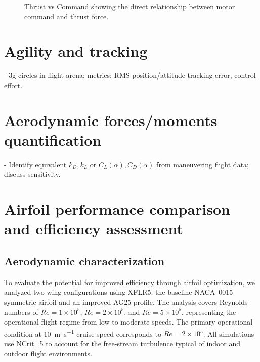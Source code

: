 \begin{figure}[htbp]
  \centering
  \caption{Thrust vs Command showing the direct relationship between motor command and thrust force.}
  \label{fig:thrust_vs_cmd}
\end{figure}

\section{Agility and tracking}
- 3g circles in flight arena; metrics: RMS position/attitude tracking error, control effort.

\section{Aerodynamic forces/moments quantification}
- Identify equivalent $k_D,k_L$ or $C_L(\alpha), C_D(\alpha)$ from maneuvering flight data; discuss sensitivity.

\section{Airfoil performance comparison and efficiency assessment}
\label{sec:airfoil_comparison}

\subsection{Aerodynamic characterization}

To evaluate the potential for improved efficiency through airfoil optimization, we analyzed two wing configurations using XFLR5: the baseline NACA~0015 symmetric airfoil and an improved AG25 profile.
The analysis covers Reynolds numbers of $Re=1\times10^5$, $Re=2\times10^5$, and $Re=5\times10^5$, representing the operational flight regime from low to moderate speeds.
The primary operational condition at \SI{10}{\meter\per\second} cruise speed corresponds to $Re=2\times10^5$.
All simulations use NCrit=5 to account for the free-stream turbulence typical of indoor and outdoor flight environments.

